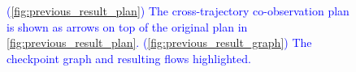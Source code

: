 \documentclass{article}
\newcommand{\new}[1]{\textcolor{blue}{#1}}
\begin{document}
  \begin{figure}[H]
	\centering
	\caption{\new{(\ref{fig:previous_result_plan}) The cross-trajectory co-observation plan is shown as arrows on top of the original plan in \cref{fig:previous_result_plan}. (\ref{fig:previous_result_graph}) The checkpoint graph and resulting flows highlighted.}}
	\label{fig:3-team-ctco}
  \end{figure}
\end{document}
